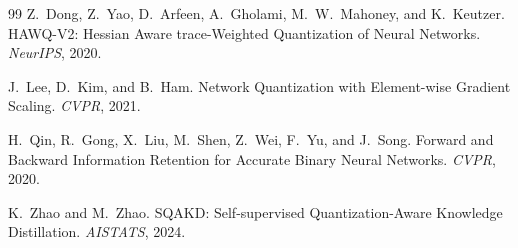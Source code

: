 \begin{thebibliography}{99}
Z.~Dong, Z.~Yao, D.~Arfeen, A.~Gholami, M.~W.~Mahoney, and K.~Keutzer.
\newblock HAWQ-V2: Hessian Aware trace-Weighted Quantization of Neural Networks.
\newblock \emph{NeurIPS}, 2020.

J.~Lee, D.~Kim, and B.~Ham.
\newblock Network Quantization with Element-wise Gradient Scaling.
\newblock \emph{CVPR}, 2021.

H.~Qin, R.~Gong, X.~Liu, M.~Shen, Z.~Wei, F.~Yu, and J.~Song.
\newblock Forward and Backward Information Retention for Accurate Binary Neural Networks.
\newblock \emph{CVPR}, 2020.

K.~Zhao and M.~Zhao.
\newblock SQAKD: Self-supervised Quantization-Aware Knowledge Distillation.
\newblock \emph{AISTATS}, 2024.

\end{thebibliography}
